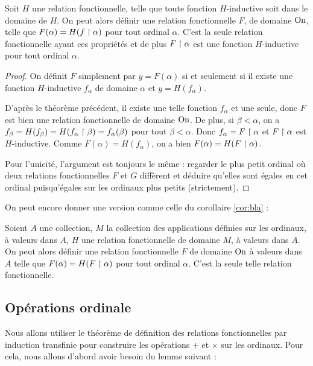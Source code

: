 \begin{them}
    Soit $H$ une relation fonctionnelle, telle que toute fonction $H$-inductive soit dans le domaine de $H$. On peut alors définir une relation fonctionnelle $F$, de domaine $\mathrm{On}$, telle que $F(\alpha) = H(f\upharpoonright\alpha)$ pour tout ordinal $\alpha$. C'est la seule relation fonctionnelle ayant ces propriétés et de plus $F\upharpoonright\alpha$ est une fonction $H$-inductive pour tout ordinal $\alpha$.
\end{them}

\begin{proof}
    On définit $F$ simplement par $y=F(\alpha)$ si et seulement si \og il existe une fonction $H$-inductive $f_\alpha$ de domaine $\alpha$ et $y = H(f_\alpha)$.

    D'après le théorème précédent, il existe une telle fonction $f_\alpha$ et une seule, donc $F$ est bien une relation fonctionnelle de domaine $\mathrm{On}$. De plus, si $\beta < \alpha$, on a $f_\beta = H(f_\beta) = H(f_\alpha\upharpoonright\beta) = f_\alpha(\beta)$ pour tout $\beta < \alpha$. Donc $f_\alpha = F\upharpoonright\alpha$ et $F\upharpoonright\alpha$ est $H$-inductive. Comme $F(\alpha) = H(f_\alpha)$, on a bien $F(\alpha) = H(F\upharpoonright\alpha)$.

    Pour l'unicité, l'argument est toujours le même : regarder le plus petit ordinal où deux relations fonctionnelles $F$ et $G$ diffèrent et déduire qu'elles sont égales en cet ordinal puisqu'égales sur les ordinaux plus petits (strictement).
\end{proof}

On peut encore donner une version comme celle du corollaire \ref{cor:bla} :

\begin{cor}
    Soient $A$ une collection, $M$ la collection des applications définies sur les ordinaux, à valeurs dans $A$, $H$ une relation fonctionnelle de domaine $M$, à valeurs dans $A$. On peut alors définir une relation fonctionnelle $F$ de domaine $\mathrm{On}$ à valeurs dans $A$ telle que $F(\alpha) = H(F\upharpoonright\alpha)$ pour tout ordinal $\alpha$. C'est la seule telle relation fonctionnelle.
\end{cor}

\subsection{Opérations ordinale}

Nous allons utiliser le théorème de définition des relations fonctionnelles par induction transfinie pour construire les opérations $+$ et $\times$ sur les ordinaux. Pour cela, nous allons d'abord avoir besoin du lemme suivant :

